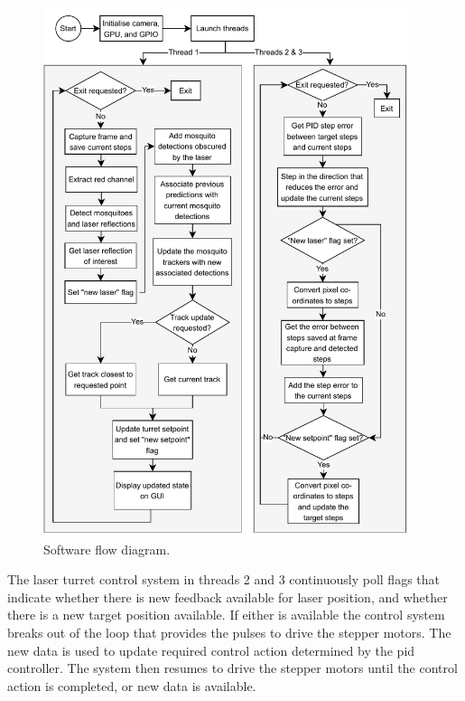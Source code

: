 \begin{figure}[!htb]
  \centering
  \includegraphics[width=0.95\textwidth]{figures/software_flow_diagram.pdf}
  \caption{Software flow diagram.}
  \label{fig:software_flow_diagram}
\end{figure}

The laser turret control system in threads 2 and 3 continuously poll flags that indicate whether there is new feedback available for laser position, and whether there is a new target position available. If either is available the control system breaks out of the loop that provides the pulses to drive the stepper motors. The new data is used to update required control action determined by the \gls{pid} controller. The system then resumes to drive the stepper motors until the control action is completed, or new data is available.

\newpage


